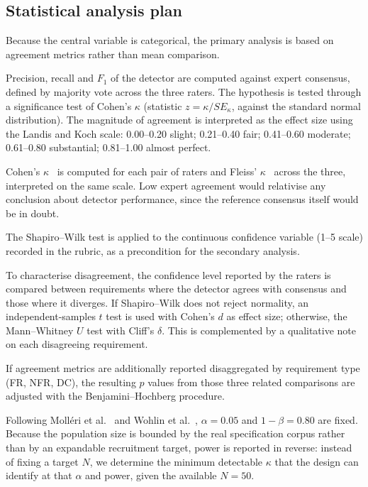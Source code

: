 \documentclass[pdflatex,sn-mathphys-num]{sn-jnl}
\theoremstyle{thmstyleone}%
\theoremstyle{thmstyletwo}%
\theoremstyle{thmstylethree}%
\begin{document}
\subsection{Statistical analysis plan}\label{subsec:analysis}

Because the central variable is categorical, the primary analysis is based on
agreement metrics rather than mean comparison.

Precision, recall and $F_1$ of the detector are computed against expert
consensus, defined by majority vote across the three raters. The hypothesis is
tested through a significance test of Cohen's $\kappa$ (statistic
$z = \kappa / SE_\kappa$, against the standard normal distribution). The
magnitude of agreement is interpreted as the effect size using the Landis and
Koch scale: 0.00--0.20 slight; 0.21--0.40 fair; 0.41--0.60 moderate; 0.61--0.80
substantial; 0.81--1.00 almost perfect.

Cohen's $\kappa$~\cite{cohen1960} is computed for each pair of raters and
Fleiss' $\kappa$~\cite{fleiss1971} across the three, interpreted on the same
scale. Low expert agreement would relativise any conclusion about detector
performance, since the reference consensus itself would be in doubt.

The Shapiro--Wilk test is applied to the continuous confidence variable
(1--5 scale) recorded in the rubric, as a precondition for the secondary
analysis.

To characterise disagreement, the confidence level reported by the raters is
compared between requirements where the detector agrees with consensus and those
where it diverges. If Shapiro--Wilk does not reject normality, an
independent-samples $t$ test is used with Cohen's $d$ as effect size; otherwise,
the Mann--Whitney $U$ test with Cliff's $\delta$. This is complemented by a
qualitative note on each disagreeing requirement.

If agreement metrics are additionally reported disaggregated by requirement type
(FR, NFR, DC), the resulting $p$ values from those three related comparisons are
adjusted with the Benjamini--Hochberg procedure.

Following Molléri et al.~\cite{molleri2020} and Wohlin et al.~\cite{wohlin2012},
$\alpha = 0.05$ and $1-\beta = 0.80$ are fixed. Because the population size is
bounded by the real specification corpus rather than by an expandable
recruitment target, power is reported in reverse: instead of fixing a target
$N$, we determine the minimum detectable $\kappa$ that the design can identify
at that $\alpha$ and power, given the available $N = 50$.
\end{document}
